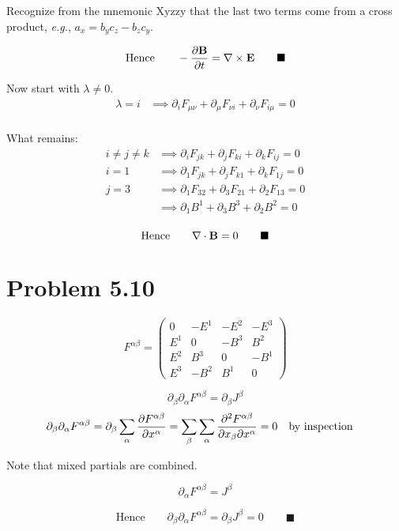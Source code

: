 \documentclass{article}
\begin{document}
Recognize from the mnemonic Xyzzy that the last two terms come from a cross product, \emph{e.g.}, $a_x=b_y c_z-b_z c_y$.

 \[\text{Hence}\qquad
-\frac{\partial \vb{B}}{\partial t}= \vb{\nabla} \times \vb{E} 
 \qquad\blacksquare\]

Now start with $\lambda\ne 0$.
\begin{align*} 
\lambda=i&\implies\partial_i F_{\mu \nu} + \partial_\mu F_{\nu i} + \partial_\nu F_{i \mu} = 0 \\
\end{align*}

What remains:
\begin{align*} 
i\ne j\ne k&\implies\partial_i F_{j k} + \partial_j F_{k i} + \partial_k F_{i j} = 0 \\
i=1&\implies\partial_1 F_{j k} + \partial_j F_{k 1} + \partial_k F_{1 j} = 0 \\
j=3&\implies\partial_1 F_{3 2} + \partial_3 F_{2 1} + \partial_2 F_{1 3} = 0 \\
&\implies\partial_1 B^1 + \partial_3 B^3 + \partial_2 B^2 = 0 \\
\end{align*}

 \[\text{Hence}\qquad
 \vb{\nabla} \cdot \vb{B} =0
 \qquad\blacksquare\]
\section*{Problem 5.10}

\[F^{\alpha \beta} = \begin{pmatrix}
  0 & -E^1 & -E^2 & -E^3 \\
  E^1 & 0 & -B^3 & B^2 \\
  E^2 & B^3 & 0 & -B^1  \\
  E^3 & -B^2 & B^1 & 0
 \end{pmatrix}\]

\[\partial_\beta \partial_\alpha F^{\alpha \beta} = \partial_\beta J^\beta\]
\[\partial_\beta \partial_\alpha F^{\alpha \beta} = \partial_\beta\sum_{\alpha} \pdv{F^{\alpha \beta}}{x^\alpha}=\sum_{\beta}\sum_{\alpha} \pdv{F^{\alpha \beta}}{x_{\beta}}{x^\alpha}=0 \qq{by inspection}\]

Note that mixed partials are combined.

\[ \partial_\alpha F^{\alpha \beta} = J^\beta \]

\[\text{Hence}\qquad \partial_\beta \partial_\alpha F^{\alpha \beta} = \partial_\beta J^\beta=0\qquad\blacksquare\]
\end{document}
